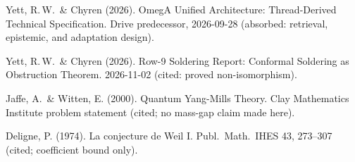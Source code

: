 \documentclass{alienfolio}
\begin{document}
Yett, R.\,W.\ \& Chyren (2026). OmegA Unified Architecture: Thread-Derived
Technical Specification. Drive predecessor, 2026-09-28 (absorbed: retrieval,
epistemic, and adaptation design).

Yett, R.\,W.\ \& Chyren (2026). Row-9 Soldering Report: Conformal Soldering
as Obstruction Theorem. 2026-11-02 (cited: proved non-isomorphism).

Jaffe, A.\ \& Witten, E. (2000). Quantum Yang-Mills Theory. Clay
Mathematics Institute problem statement (cited; no mass-gap claim made here).

Deligne, P. (1974). La conjecture de Weil I. Publ.\ Math.\ IHES 43, 273--307
(cited; coefficient bound only).
\end{document}
